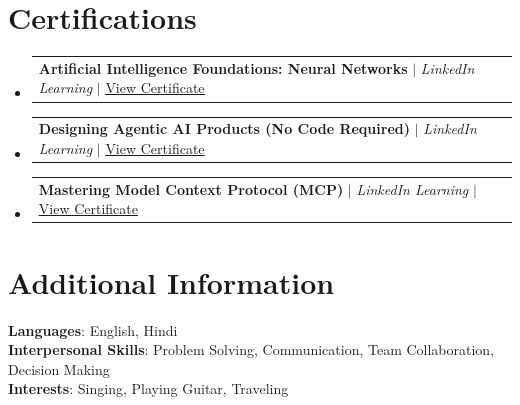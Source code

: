 \documentclass[letterpaper,11pt]{article}
\makeatletter
\newcommand{\resumeProjectHeading}[2]{
    \item
    \begin{tabular*}{0.97\textwidth}{l@{\extracolsep{\fill}}r}
      \small#1 & #2 \\
    \end{tabular*}\vspace{-7pt}
}
\newcommand{\resumeSubHeadingListStart}{\begin{itemize}[leftmargin=0.15in, label={}]}
\newcommand{\resumeSubHeadingListEnd}{\end{itemize}}
\makeatother
\begin{document}
\section{Certifications}
  \resumeSubHeadingListStart
    \resumeProjectHeading
      {\textbf{Artificial Intelligence Foundations: Neural Networks} $|$ \emph{LinkedIn Learning} $|$ \href{https://www.linkedin.com/learning/certificates/c39afa370d4fa2cb79b9ac5601108f4949bc165fc1d5a694cdb8eebfce545f01}{\underline{View Certificate}}}{}
    \resumeProjectHeading
      {\textbf{Designing Agentic AI Products (No Code Required)} $|$ \emph{LinkedIn Learning} $|$ \href{https://www.linkedin.com/learning/certificates/96438e8bc6c87f092c1a020770d996632de4a5c25a44a588babd807c98765bcd}{\underline{View Certificate}}}{}
    \resumeProjectHeading
      {\textbf{Mastering Model Context Protocol (MCP)} $|$ \emph{LinkedIn Learning} $|$ \href{https://www.linkedin.com/learning/certificates/b12167836a22d7b9be3ec672b57ab4e958402ce890ad56bd865e0586f15e1376}{\underline{View Certificate}}}{}
  \resumeSubHeadingListEnd

\section{Additional Information}
\begin{itemize}[leftmargin=0.15in, label={}]
    \small{\item{
     \textbf{Languages}{: English, Hindi} \\
     \textbf{Interpersonal Skills}{: Problem Solving, Communication, Team Collaboration, Decision Making} \\
     \textbf{Interests}{: Singing, Playing Guitar, Traveling} \\
    }}
\end{itemize}

\end{document}
